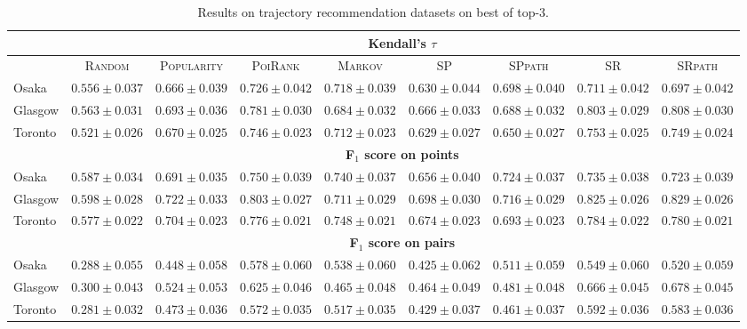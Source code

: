 \begin{table*}[!h]
\centering
\scriptsize
\setlength{\tabcolsep}{3pt} %
\begin{tabular}{l|cc|ccc|ccc} \hline
& \multicolumn{8}{c}{\bf Kendall's $\tau$} \\ \hline
 & \textsc{Random} & \textsc{Popularity} & \textsc{PoiRank} & \textsc{Markov} & \textsc{SP} & \textsc{SPpath} & \textsc{SR} & \textsc{SRpath} \\ \hline
Osaka & $0.556\pm0.037$ & $0.666\pm0.039$ & $\mathbf{0.726\pm0.042}$ & $\mathit{0.718\pm0.039}$ & $0.630\pm0.044$ & $0.698\pm0.040$ & $0.711\pm0.042$ & $0.697\pm0.042$ \\
Glasgow & $0.563\pm0.031$ & $0.693\pm0.036$ & $0.781\pm0.030$ & $0.684\pm0.032$ & $0.666\pm0.033$ & $0.688\pm0.032$ & $\mathit{0.803\pm0.029}$ & $\mathbf{0.808\pm0.030}$ \\
Toronto & $0.521\pm0.026$ & $0.670\pm0.025$ & $0.746\pm0.023$ & $0.712\pm0.023$ & $0.629\pm0.027$ & $0.650\pm0.027$ & $\mathbf{0.753\pm0.025}$ & $\mathit{0.749\pm0.024}$ \\
\hline
& \multicolumn{8}{c}{\bf F$_1$ score on points} \\ \hline
Osaka & $0.587\pm0.034$ & $0.691\pm0.035$ & $\mathbf{0.750\pm0.039}$ & $\mathit{0.740\pm0.037}$ & $0.656\pm0.040$ & $0.724\pm0.037$ & $0.735\pm0.038$ & $0.723\pm0.039$ \\
Glasgow & $0.598\pm0.028$ & $0.722\pm0.033$ & $0.803\pm0.027$ & $0.711\pm0.029$ & $0.698\pm0.030$ & $0.716\pm0.029$ & $\mathit{0.825\pm0.026}$ & $\mathbf{0.829\pm0.026}$ \\
Toronto & $0.577\pm0.022$ & $0.704\pm0.023$ & $0.776\pm0.021$ & $0.748\pm0.021$ & $0.674\pm0.023$ & $0.693\pm0.023$ & $\mathbf{0.784\pm0.022}$ & $\mathit{0.780\pm0.021}$ \\
\hline
& \multicolumn{8}{c}{\bf F$_1$ score on pairs} \\ \hline
Osaka & $0.288\pm0.055$ & $0.448\pm0.058$ & $\mathbf{0.578\pm0.060}$ & $0.538\pm0.060$ & $0.425\pm0.062$ & $0.511\pm0.059$ & $\mathit{0.549\pm0.060}$ & $0.520\pm0.059$ \\
Glasgow & $0.300\pm0.043$ & $0.524\pm0.053$ & $0.625\pm0.046$ & $0.465\pm0.048$ & $0.464\pm0.049$ & $0.481\pm0.048$ & $\mathit{0.666\pm0.045}$ & $\mathbf{0.678\pm0.045}$ \\
Toronto & $0.281\pm0.032$ & $0.473\pm0.036$ & $0.572\pm0.035$ & $0.517\pm0.035$ & $0.429\pm0.037$ & $0.461\pm0.037$ & $\mathbf{0.592\pm0.036}$ & $\mathit{0.583\pm0.036}$ \\
\hline
\end{tabular}
\caption{Results on trajectory recommendation datasets on best of top-3.}
\end{table*}



